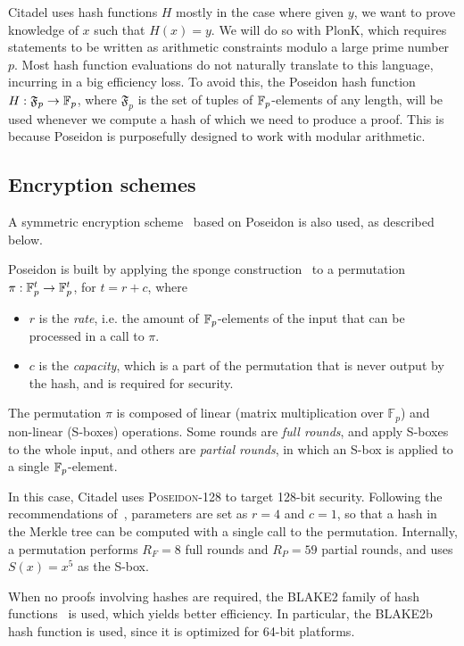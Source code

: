 Citadel uses hash functions $H$ mostly in the case where given $y$, we want to prove knowledge of $x$ such that $H(x)=y$. We will do so with PlonK, which requires statements to be written as arithmetic constraints modulo a large prime number $p$. Most hash function evaluations do not naturally translate to this language, incurring in a big efficiency loss. 
%
To avoid this, the Poseidon hash function~\cite{grassi2021poseidon} $H:\mathfrak{F}_p\rightarrow \mathbb{F}_p$, where $\mathfrak{F}_p$ is the set of tuples of $\mathbb{F}_p$-elements of any length, will be used whenever we compute a hash of which we need to produce a proof. This is because Poseidon is purposefully designed to work with modular arithmetic. 

\subsection{Encryption schemes}\label{sec:encryption}

A symmetric encryption scheme~\cite{duskDmitry} based on Poseidon is also used, as described below.

Poseidon is built by applying the sponge construction~\cite{bertoni2011cryptographic} to a permutation $\pi : \mathbb{F}_p^t \rightarrow \mathbb{F}_p^t$, for $t=r+c$, where
\begin{itemize}
	\item $r$ is the \emph{rate}, i.e. the amount of $\mathbb{F}_p$-elements of the input that can be processed in a call to $\pi$.
	\item $c$ is the \emph{capacity}, which is a part of the permutation that is never output by the hash, and is required for security.
\end{itemize}
The permutation $\pi$ is composed of linear (matrix multiplication over $\mathbb{F}_p$) and non-linear (S-boxes) operations. Some rounds are \emph{full rounds}, and apply S-boxes to the whole input, and others are \emph{partial rounds}, in which an S-box is applied to a single $\mathbb{F}_p$-element.

In this case, Citadel uses \textsc{Poseidon}-128 to target 128-bit security. Following the recommendations of~\cite{grassi2021poseidon}, parameters are set as $r=4$ and $c=1$, so that a hash in the Merkle tree can be computed with a single call to the permutation. Internally, a permutation performs $R_F=8$ full rounds and $R_P=59$ partial rounds, and uses $S(x)=x^5$ as the S-box.

When no proofs involving hashes are required, the BLAKE2 family of hash functions~\cite{rfc7693} is used, which yields better efficiency. In particular, the BLAKE2b hash function is used, since it is optimized for 64-bit platforms.

